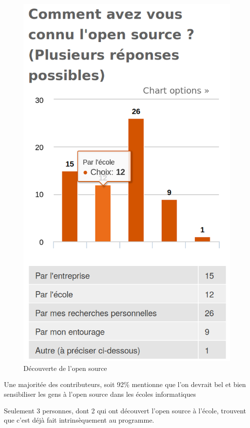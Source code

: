 			\begin{figure}[h]
				\center
				\includegraphics[scale=0.28]{./img/a3}
				\caption{Découverte de l'open source}
			\end{figure}

			\newpage

			Une majoritée des contributeurs, soit 92\% mentionne que l'on devrait bel et bien sensibiliser les gens à l'open source dans les écoles informatiques

			Seulement 3 personnes, dont 2 qui ont découvert l'open source à l'école, trouvent que c'est déjà fait intrinsèquement au programme.


